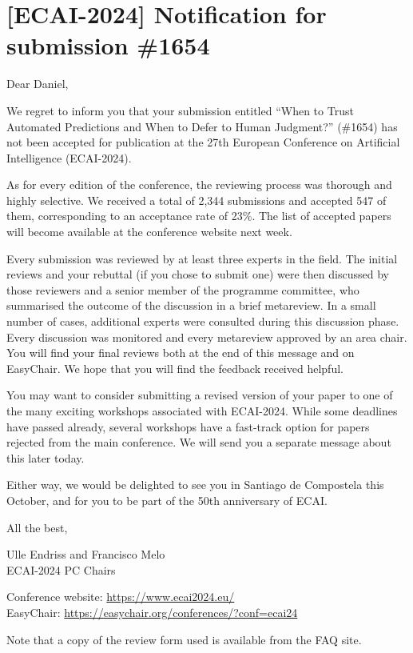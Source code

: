 \section*{[ECAI-2024] Notification for submission \#1654}

Dear Daniel,

We regret to inform you that your submission entitled ``When to Trust Automated Predictions and When to Defer to Human Judgment?'' (\#1654) has not been accepted for publication at the 27th European Conference on Artificial Intelligence (ECAI-2024).

As for every edition of the conference, the reviewing process was thorough and highly selective. We received a total of 2,344 submissions and accepted 547 of them, corresponding to an acceptance rate of 23\%. The list of accepted papers will become available at the conference website next week.

Every submission was reviewed by at least three experts in the field. The initial reviews and your rebuttal (if you chose to submit one) were then discussed by those reviewers and a senior member of the programme committee, who summarised the outcome of the discussion in a brief metareview. In a small number of cases, additional experts were consulted during this discussion phase. Every discussion was monitored and every metareview approved by an area chair. You will find your final reviews both at the end of this message and on EasyChair. We hope that you will find the feedback received helpful.

You may want to consider submitting a revised version of your paper to one of the many exciting workshops associated with ECAI-2024. While some deadlines have passed already, several workshops have a fast-track option for papers rejected from the main conference. We will send you a separate message about this later today.

Either way, we would be delighted to see you in Santiago de Compostela this October, and for you to be part of the 50th anniversary of ECAI.

All the best,

Ulle Endriss and Francisco Melo\\
ECAI-2024 PC Chairs

Conference website: \url{https://www.ecai2024.eu/}\\
EasyChair: \url{https://easychair.org/conferences/?conf=ecai24}

Note that a copy of the review form used is available from the FAQ site.

